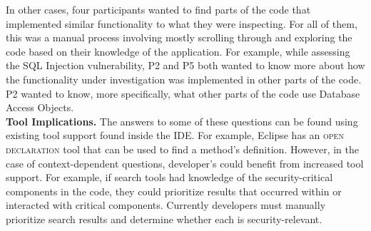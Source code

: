 \documentclass[conference]{IEEEtran}
\begin{document}
In other cases, four participants wanted to find parts of the code that implemented similar functionality to what they were inspecting.
For all of them, this was a manual process involving mostly scrolling through and exploring the code based on their knowledge of the application.
For example, while assessing the SQL Injection vulnerability, P2 and P5 both wanted to know more about how the functionality under investigation was implemented in other parts of the code. 
P2 wanted to know, more specifically, what other parts of the code use Database Access Objects.
\\




\noindent\textbf{Tool Implications.}
The answers to some of these questions can be found using existing tool support found inside the IDE. 
For example, Eclipse has an \textsc{open declaration} tool that can be used to find a method's definition. 
However, in the case of context-dependent questions, developer's could benefit from increased tool support. 
For example, if search tools had knowledge of the security-critical components in the code, they could prioritize results that occurred within or interacted with critical components.
Currently developers must manually prioritize search results and determine whether each is security-relevant.
\end{document}
